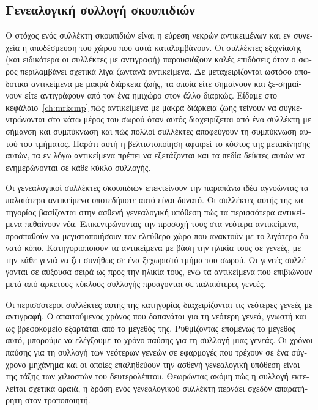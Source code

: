 \begin{greek}
\chapter{Γενεαλογική συλλογή σκουπιδιών}\label{ch:gen}

Ο στόχος ενός συλλέκτη σκουπιδιών είναι η εύρεση νεκρών αντικειμένων
και εν συνεχεία η αποδέσμευση του χώρου που αυτά καταλαμβάνουν.
Οι συλλέκτες εξιχνίασης (και ειδικότερα οι συλλέκτες με αντιγραφή)
παρουσιάζουν καλές επιδόσεις όταν ο σωρός περιλαμβάνει σχετικά
λίγα ζωντανά αντικείμενα. Δε μεταχειρίζονται ωστόσο αποδοτικά
αντικείμενα με μακρά διάρκεια ζωής, τα οποία είτε σημαίνουν και
ξε-σημαίνουν είτε αντιγράφουν από τον ένα ημιχώρο στον άλλο
διαρκώς. Είδαμε στο κεφάλαιο~\ref{ch:mrkcmp} πώς αντικείμενα με
μακρά διάρκεια ζωής τείνουν να συγκεντρώνονται στο κάτω μέρος
του σωρού όταν αυτός διαχειρίζεται από ένα συλλέκτη με σήμανση
και συμπύκνωση και πώς πολλοί συλλέκτες αποφεύγουν τη συμπύκνωση
αυτού του τμήματος. Παρότι αυτή η βελτιστοποίηση αφαιρεί το κόστος
της μετακίνησης αυτών, τα εν λόγω αντικείμενα πρέπει να εξετάζονται
και τα πεδία δείκτες αυτών να ενημερώνονται σε κάθε κύκλο συλλογής. 

Οι γενεαλογικοί συλλέκτες σκουπιδιών επεκτείνουν την παραπάνω
ιδέα αγνοώντας τα παλαιότερα αντικείμενα οποτεδήποτε αυτό είναι
δυνατό. Οι συλλέκτες αυτής της κατηγορίας βασίζονται στην ασθενή
γενεαλογική υπόθεση πώς τα περισσότερα αντικείμενα πεθαίνουν νέα.
Επικεντρώνοντας την προσοχή τους στα νεότερα αντικείμενα, προσπαθούν
να μεγιστοποιήσουν τον ελεύθερο χώρο που ανακτούν με το λιγότερο
δυνατό κόπο. Κατηγοριοποιούν τα αντικείμενα με βάση την ηλικία
τους σε γενεές, με την κάθε γενιά να ζει συνήθως σε ένα ξεχωριστό
τμήμα του σωρού. Οι γενεές συλλέγονται σε αύξουσα σειρά ως προς
την ηλικία  τους, ενώ  τα αντικείμενα που επιβιώνουν μετά από
αρκετούς κύκλους συλλογής προάγονται σε παλαιότερες γενεές.

Οι περισσότεροι συλλέκτες αυτής της κατηγορίας διαχειρίζονται
τις νεότερες γενεές με αντιγραφή. Ο απαιτούμενος χρόνος που
δαπανάται για τη νεότερη γενεά, γνωστή και ως βρεφοκομείο εξαρτάται
από το μέγεθός της. Ρυθμίζοντας επομένως το μέγεθος αυτό, μπορούμε
να ελέγξουμε το χρόνο παύσης για τη συλλογή μιας γενεάς. Οι χρόνοι
παύσης για τη συλλογή των νεότερων γενεών σε εφαρμογές που τρέχουν
σε ένα σύγχρονο μηχάνημα και οι οποίες επαληθεύουν την ασθενή
γενεαλογική υπόθεση είναι της τάξης των χιλιοστών του δευτερολέπτου.
Θεωρώντας ακόμη πώς η συλλογή εκτελείται σχετικά αραιά, η δράση
ενός γενεαλογικού συλλέκτη περνάει σχεδόν απαρατήρητη στον τροποποιητή.


\end{greek}
